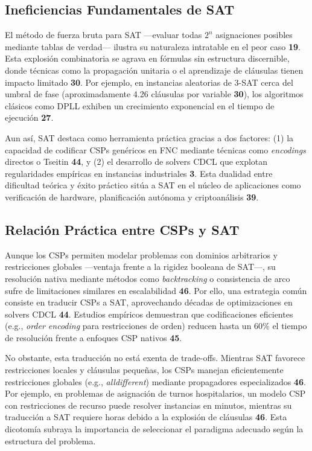 \subsection{Ineficiencias Fundamentales de SAT}
\label{subsec:ineficiencia-sat}

El método de fuerza bruta para SAT —evaluar todas $2^n$ asignaciones posibles mediante tablas de verdad— ilustra su naturaleza intratable en el peor caso \textbf{19}. Esta explosión combinatoria se agrava en fórmulas sin estructura discernible, donde técnicas como la propagación unitaria o el aprendizaje de cláusulas tienen impacto limitado \textbf{30}. Por ejemplo, en instancias aleatorias de 3-SAT cerca del umbral de fase (aproximadamente 4.26 cláusulas por variable \textbf{30}), los algoritmos clásicos como DPLL exhiben un crecimiento exponencial en el tiempo de ejecución \textbf{27}.

Aun así, SAT destaca como herramienta práctica gracias a dos factores: (1) la capacidad de codificar CSPs genéricos en FNC mediante técnicas como \textit{encodings} directos o Tseitin \textbf{44}, y (2) el desarrollo de solvers CDCL que explotan regularidades empíricas en instancias industriales \textbf{3}. Esta dualidad entre dificultad teórica y éxito práctico sitúa a SAT en el núcleo de aplicaciones como verificación de hardware, planificación autónoma y criptoanálisis \textbf{39}.

\subsection{Relación Práctica entre CSPs y SAT}
\label{subsec:csp-sat-relacion}

Aunque los CSPs permiten modelar problemas con dominios arbitrarios y restricciones globales —ventaja frente a la rigidez booleana de SAT—, su resolución nativa mediante métodos como \textit{backtracking} o consistencia de arco sufre de limitaciones similares en escalabilidad \textbf{46}. Por ello, una estrategia común consiste en traducir CSPs a SAT, aprovechando décadas de optimizaciones en solvers CDCL \textbf{44}. Estudios empíricos demuestran que codificaciones eficientes (e.g., \textit{order encoding} para restricciones de orden) reducen hasta un 60\% el tiempo de resolución frente a enfoques CSP nativos \textbf{45}.

No obstante, esta traducción no está exenta de trade-offs. Mientras SAT favorece restricciones locales y cláusulas pequeñas, los CSPs manejan eficientemente restricciones globales (e.g., \textit{alldifferent}) mediante propagadores especializados \textbf{46}. Por ejemplo, en problemas de asignación de turnos hospitalarios, un modelo CSP con restricciones de recurso puede resolver instancias en minutos, mientras su traducción a SAT requiere horas debido a la explosión de cláusulas \textbf{46}. Esta dicotomía subraya la importancia de seleccionar el paradigma adecuado según la estructura del problema.


